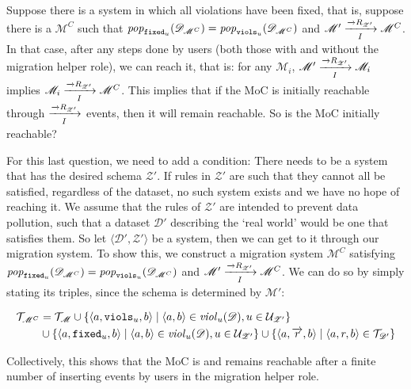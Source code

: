 \documentclass[runningheads]{llncs}
\newcommand{\id}[1]{\text{\it #1\/}}
\newcommand{\popF}[1]{\id{pop}_{#1}}
\newcommand{\pop}[2]{\popF{#1}(#2)}
\newcommand{\viol}[2]{\violC{#1}(#2)}
\newcommand{\violC}[1]{\id{viol}_{#1}}
\newcommand{\pair}[2]{\langle{#1},{#2}\rangle}
\newcommand{\triple}[3]{\langle{#1},{#2},{#3}\rangle}
\newcommand{\rels}{\mathcal{R}}   %
\newcommand{\triples}{\mathcal{T}}
\newcommand{\rules}{\mathcal{U}}
\newcommand{\dataset}{\mathscr{D}}
\newcommand{\schema}{\mathscr{Z}}
\newcommand{\migrsys}{\mathscr{M}}
\begin{document}
   Suppose there is a system in which all violations have been fixed, that is, suppose there is a $\migrsys^C$ such that $\pop{{\tt fixed}_u}{\dataset_{\migrsys^C}}=\pop{{\tt viols}_u}{\dataset_{\migrsys^C}}$ and $\migrsys'\xrightarrow[I]{\overrightarrow\rels_{\schema'}} \migrsys^C$.
   In that case, after any steps done by users (both those with and without the migration helper role), we can reach it, that is: for any $\migrsys_i$, $\migrsys'\xrightarrow[I]{\overrightarrow\rels_{\schema'}} \migrsys_i$ implies $\migrsys_i\xrightarrow[I]{\overrightarrow\rels_{\schema'}} \migrsys^C$.
   This implies that if the MoC is initially reachable through $\xrightarrow[I]{\overrightarrow\rels_{\schema'}}$ events, then it will remain reachable.
   So is the MoC initially reachable?
   
   For this last question, we need to add a condition:
   There needs to be a system that has the desired schema $\schema'$.
   If rules in $\schema'$ are such that they cannot all be satisfied, regardless of the dataset, no such system exists and we have no hope of reaching it.
   We assume that the rules of $\schema'$ are intended to prevent data pollution, such that a dataset $\dataset'$ describing the `real world' would be one that satisfies them.
   So let $\pair{\dataset'}{\schema'}$ be a system, then we can get to it through our migration system.
   To show this, we construct a migration system $\migrsys^C$ satisfying $\pop{{\tt fixed}_u}{\dataset_{\migrsys^C}}=\pop{{\tt viols}_u}{\dataset_{\migrsys^C}}$ and $\migrsys'\xrightarrow[I]{\overrightarrow\rels_{\schema'}} \migrsys^C$.
   We can do so by simply stating its triples, since the schema is determined by $\migrsys'$:
   
\begin{align}
   \begin{aligned}
   \triples_{\migrsys^C} &= \triples_\migrsys 
   \cup  \{\triple{a}{{\tt viols}_u}{b} \mid \pair{a}{b}\in \viol{u}{\dataset}, u\in \rules_{\schema'} \} \\
   &\cup \{\triple{a}{{\tt fixed}_u}{b} \mid \pair{a}{b}\in \viol{u}{\dataset}, u\in \rules_{\schema'} \}
   \cup \{\triple{a}{\overrightarrow{r}}{b} \mid \triple{a}{r}{b}\in\triples_{\dataset'}\}   
   \end{aligned}
\end{align}
   
   Collectively, this shows that the MoC is and remains reachable after a finite number of inserting events by users in the migration helper role.
   
\end{document}
